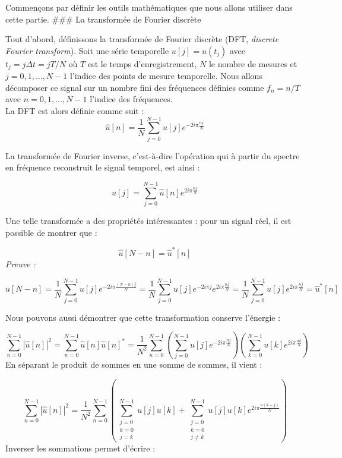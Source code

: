 \documentclass[11pt]{article}
\begin{document}
Commençons par définir les outils mathématiques que nous allons utiliser
dans cette partie. \#\#\# La transformée de Fourier discrète

    Tout d'abord, définissons la transformée de Fourier discrète (DFT,
\emph{discrete Fourier transform}). Soit une série temporelle
\(u[j] = u(t_{j})\) avec \(t_{j} = j\Delta t = j T/N\) où \(T\) est le
temps d'enregistrement, \(N\) le nombre de mesures et
\(j = 0,1, \ldots ,N-1\) l'indice des points de mesure temporelle. Nous
allons décomposer ce signal sur un nombre fini des fréquences définies
comme \(f_{n} = n/T\) avec \(n = 0,1,\ldots,N - 1\) l'indice des
fréquences.\\
La DFT est alors définie comme suit :
\[ \hat{u}[n] = \frac{1}{N} \sum_{j=0}^{N-1}u[j] e^{-2 i \pi \frac{nj}{N}}\]

La transformée de Fourier inverse, c'est-à-dire l'opération qui à partir
du spectre en fréquence reconstruit le signal temporel, est ainsi :

\[u[j] = \sum_{j=0}^{N-1} \hat{u}[n] e^{2 i \pi \frac{nj}{N}}\]

Une telle transformée a des propriétés intéressantes : pour un signal
réel, il est possible de montrer que :

\[ \hat{u}[N - n] = \hat{u}^*[n]\] \emph{Preuve :}

\[ \hat{u}[N - n] = \frac{1}{N} \sum_{j=0}^{N-1}u[j] e^{-2 i \pi \frac{(N-n)j}{N}} = \frac{1}{N} \sum_{j=0}^{N-1}u[j] e^{-2i \pi j} e^{2 i \pi \frac{nj}{N}} = \frac{1}{N} \sum_{j=0}^{N-1}u[j] e^{2 i \pi \frac{nj}{N}} = \hat{u}^*[n]\]

Nous pouvons aussi démontrer que cette transformation conserve l'énergie
:

\[ \sum_{n=0}^{N-1} \left| \hat{u}[n] \right| ^2  = \sum_{n=0}^{N-1} \hat{u}[n] \hat{u}[n]^* = \frac{1}{N^2} \sum_{n = 0}^{N-1} \left( \sum_{j=0}^{N-1} u[j] e^{-2i\pi \frac{nj}{N}} \right) \left( \sum_{k=0}^{N-1} u[k] e^{2i\pi \frac{nk}{N}} \right)\]
En séparant le produit de sommes en une somme de sommes, il vient :

\[ \sum_{n=0}^{N-1} \left| \hat{u}[n] \right| ^2 = \frac{1}{N^2} \sum_{n = 0}^{N-1} \left( \sum_{\substack{j=0\\ k=0\\ j=k}}^{N-1} u[j] u[k] + \sum_{\substack{j=0\\ k=0\\ j\neq k}}^{N-1} u[j]u[k] e^{2i\pi \frac{n(k-j)}{N}} \right)\]
Inverser les sommations permet d'écrire :
\end{document}
